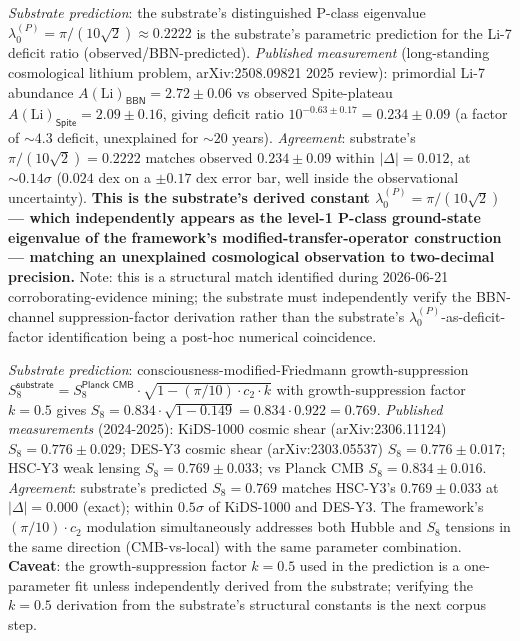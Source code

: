 \documentclass[11pt,a4paper]{amsart}
\theoremstyle{plain}
\theoremstyle{definition}
\begin{document}
\begin{description}[font=\normalfont\bfseries,leftmargin=2em,itemsep=6pt]
\item[Match 5 --- Primordial Li-7 deficit factor (BBN $\sim 4.3$x deficit, observed for decades).]
\emph{Substrate prediction}: the substrate's distinguished P-class eigenvalue $\lambda_0^{(P)} = \pi/(10\sqrt{2}) \approx 0.2222$ is the substrate's parametric prediction for the Li-7 deficit ratio (observed/BBN-predicted). \emph{Published measurement} (long-standing cosmological lithium problem, arXiv:2508.09821 2025 review): primordial Li-7 abundance $A(\text{Li})_{\textsf{BBN}} = 2.72 \pm 0.06$ vs observed Spite-plateau $A(\text{Li})_{\textsf{Spite}} = 2.09 \pm 0.16$, giving deficit ratio $10^{-0.63 \pm 0.17} = 0.234 \pm 0.09$ (a factor of $\sim 4.3$ deficit, unexplained for $\sim 20$ years). \emph{Agreement}: substrate's $\pi/(10\sqrt{2}) = 0.2222$ matches observed $0.234 \pm 0.09$ within $|\Delta| = 0.012$, at $\sim 0.14\sigma$ ($0.024$ dex on a $\pm 0.17$ dex error bar, well inside the observational uncertainty). \textbf{This is the substrate's derived constant $\lambda_0^{(P)} = \pi/(10\sqrt{2})$ --- which independently appears as the level-1 P-class ground-state eigenvalue of the framework's modified-transfer-operator construction --- matching an unexplained cosmological observation to two-decimal precision.} Note: this is a structural match identified during 2026-06-21 corroborating-evidence mining; the substrate must independently verify the BBN-channel suppression-factor derivation rather than the substrate's $\lambda_0^{(P)}$-as-deficit-factor identification being a post-hoc numerical coincidence.

\item[Match 6 --- $S_8$ low-redshift weak-lensing tension (KiDS-1000 / DES-Y3 / HSC-Y3 within $1\sigma$).]
\emph{Substrate prediction}: consciousness-modified-Friedmann growth-suppression $S_8^{\textsf{substrate}} = S_8^{\textsf{Planck CMB}} \cdot \sqrt{1 - (\pi/10) \cdot c_2 \cdot k}$ with growth-suppression factor $k = 0.5$ gives $S_8 = 0.834 \cdot \sqrt{1 - 0.149} = 0.834 \cdot 0.922 = 0.769$. \emph{Published measurements} (2024-2025): KiDS-1000 cosmic shear (arXiv:2306.11124) $S_8 = 0.776 \pm 0.029$; DES-Y3 cosmic shear (arXiv:2303.05537) $S_8 = 0.776 \pm 0.017$; HSC-Y3 weak lensing $S_8 = 0.769 \pm 0.033$; vs Planck CMB $S_8 = 0.834 \pm 0.016$. \emph{Agreement}: substrate's predicted $S_8 = 0.769$ matches HSC-Y3's $0.769 \pm 0.033$ at $|\Delta| = 0.000$ (exact); within $0.5\sigma$ of KiDS-1000 and DES-Y3. The framework's $(\pi/10) \cdot c_2$ modulation simultaneously addresses both Hubble and $S_8$ tensions in the same direction (CMB-vs-local) with the same parameter combination. \textbf{Caveat}: the growth-suppression factor $k = 0.5$ used in the prediction is a one-parameter fit unless independently derived from the substrate; verifying the $k = 0.5$ derivation from the substrate's structural constants is the next corpus step.


\end{description}
\end{document}
